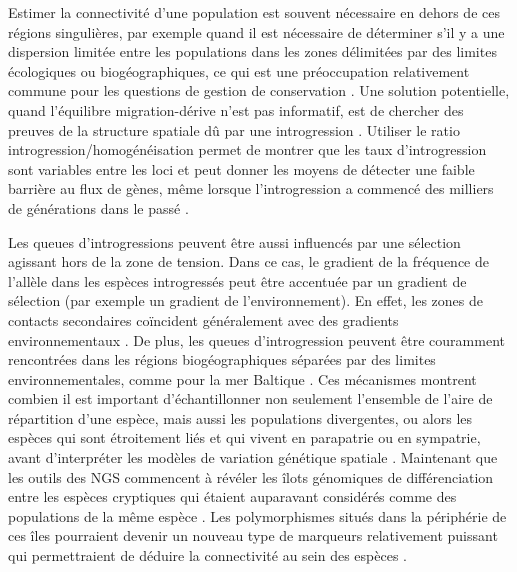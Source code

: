 \documentclass[a4paper,11pt,twoside]{report}
\begin{document}
Estimer la connectivité d'une population est souvent nécessaire en dehors de ces régions singulières, par exemple quand il est nécessaire de déterminer s'il y a une dispersion limitée entre les populations dans les zones délimitées par des limites écologiques ou biogéographiques, ce qui est une préoccupation relativement commune pour les questions de gestion de conservation \citep{allendorf2010genomics}. Une solution potentielle, quand l'équilibre migration-dérive n'est pas informatif, est de chercher des preuves de la structure spatiale dû par une introgression \citep{gagnaire2011within}. Utiliser le ratio introgression/homogénéisation permet de montrer que les taux d'introgression sont variables entre les loci et peut donner les moyens de détecter une faible barrière au flux de gènes, même lorsque l'introgression a commencé des milliers de générations dans le passé \citep{Gagnaire:2015aa}.

Les queues d'introgressions peuvent être aussi influencés par une sélection agissant hors de la zone de tension. Dans ce cas, le gradient de la fréquence de l'allèle dans les espèces introgressés peut être accentuée par un gradient de sélection (par exemple un gradient de l'environnement). En effet, les zones de contacts secondaires coïncident généralement avec des gradients environnementaux \cite{bierne2011coupling}. De plus, les queues d'introgression peuvent être couramment rencontrées dans les régions biogéographiques séparées par des limites environnementales, comme pour la mer Baltique \citep{Gagnaire:2015aa}. Ces mécanismes montrent combien il est important d'échantillonner non seulement l'ensemble de l'aire de répartition d'une espèce, mais aussi les populations divergentes, ou alors les espèces qui sont étroitement liés et qui vivent en parapatrie ou en sympatrie, avant d'interpréter les modèles de variation génétique spatiale \citep{gagnaire2011within}\citep{cullingham2013effects}\citep{gosset2013differential}\citep{Gagnaire:2015aa}. Maintenant que les outils des NGS commencent à révéler les îlots génomiques de différenciation entre les espèces cryptiques qui étaient auparavant considérés comme des populations de la même espèce \citep{hemmer2013genomic}\citep{karlsen2013genomic}\citep{tine2014european}. Les polymorphismes situés dans la périphérie de ces îles pourraient devenir un nouveau type de marqueurs relativement puissant qui permettraient de déduire la connectivité au sein des espèces \citep{Gagnaire:2015aa}. 
\end{document}
